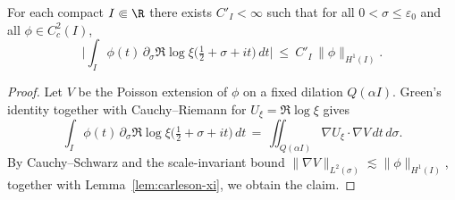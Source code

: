 \begin{lemma}\label{lem:xi-deriv-L1}
For each compact \(I\Subset\R\) there exists \(C'_I<\infty\) such that for all \(0<\sigma\le\varepsilon_0\) and all \(\phi\in C_c^2(I)\),
\[
  \Big|\int_I \phi(t)\,\partial_\sigma\Re\log\xi\!\big(\tfrac12+\sigma+it\big)\,dt\Big|
  \ \le\ C'_I\,\|\phi\|_{H^1(I)}.
\]
\end{lemma}
\begin{proof}
Let \(V\) be the Poisson extension of \(\phi\) on a fixed dilation \(Q(\alpha I)\).
Green's identity together with Cauchy--Riemann for \(U_\xi=\Re\log\xi\) gives
\[
  \int_I \phi(t)\,\partial_\sigma\Re\log\xi\!\big(\tfrac12+\sigma+it\big)\,dt
  \,=\, \iint_{Q(\alpha I)} \nabla U_\xi\cdot\nabla V\,dt\,d\sigma.
\]
By Cauchy--Schwarz and the scale-invariant bound \(\|\nabla V\|_{L^2(\sigma)}\lesssim \|\phi\|_{H^1(I)}\), together with Lemma~\ref{lem:carleson-xi}, we obtain the claim.
\end{proof}

